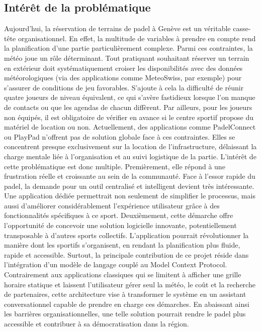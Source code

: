\documentclass[12pt]{article}
\begin{document}
\subsection{Intérêt de la problématique}
Aujourd'hui, la réservation de terrains de padel à Genève est un véritable casse-tête organisationnel. En effet, la multitude de variables à prendre en compte rend la planification d'une partie particulièrement complexe.
\newline\newline
Parmi ces contraintes, la météo joue un rôle déterminant. Tout pratiquant souhaitant réserver un terrain en extérieur doit systématiquement croiser les disponibilités avec des données météorologiques (via des applications comme MeteoSwiss, par exemple) pour s'assurer de conditions de jeu favorables. S'ajoute à cela la difficulté de réunir quatre joueurs de niveau équivalent, ce qui s'avère fastidieux lorsque l'on manque de contacts ou que les agendas de chacun diffèrent. Par ailleurs, pour les joueurs non équipés, il est obligatoire de vérifier en avance si le centre sportif propose du matériel de location ou non.
\newline\newline
Actuellement, des applications comme PadelConnect ou PlayPad n'offrent pas de solution globale face à ces contraintes. Elles se concentrent presque exclusivement sur la location de l'infrastructure, délaissant la charge mentale liée à l'organisation et au suivi logistique de la partie.
\newline\newline
L'intérêt de cette problématique est donc multiple. Premièrement, elle répond à une frustration réelle et croissante au sein de la communauté. Face à l'essor rapide du padel, la demande pour un outil centralisé et intelligent devient très intéressante. Une application dédiée permettrait non seulement de simplifier le processus, mais aussi d'améliorer considérablement l'expérience utilisateur grâce à des fonctionnalités spécifiques à ce sport.
\newline\newline
Deuxièmement, cette démarche offre l'opportunité de concevoir une solution logicielle innovante, potentiellement transposable à d'autres sports collectifs. L'application pourrait révolutionner la manière dont les sportifs s'organisent, en rendant la planification plus fluide, rapide et accessible.
\newline\newline
Surtout, la principale contribution de ce projet réside dans l'intégration d'un modèle de langage couplé au Model Context Protocol. Contrairement aux applications classiques qui se limitent à afficher une grille horaire statique et laissent l'utilisateur gérer seul la météo, le coût et la recherche de partenaires, cette architecture vise à transformer le système en un assistant conversationnel capable de prendre en charge ces démarches. En abaissant ainsi les barrières organisationnelles, une telle solution pourrait rendre le padel plus accessible et contribuer à sa démocratisation dans la région.
\end{document}
